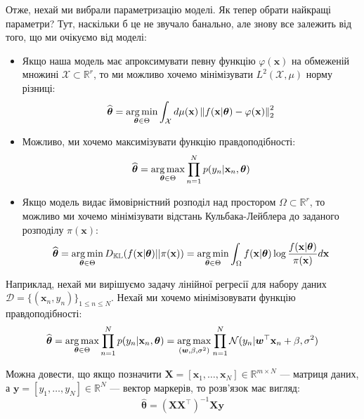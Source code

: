 Отже, нехай ми вибрали параметризацію моделі. Як тепер обрати найкращі параметри?
Тут, наскільки б це не звучало банально, але знову все залежить від того, що ми
очікуємо від моделі:
\begin{itemize}
	\item Якщо наша модель має апроксимувати певну функцію $\varphi(\mathbf{x})$ на 
	обмеженій множині $\mathcal{X} \subset \mathbb{R}^r$, то ми можливо хочемо 
	мінімізувати $L^2(\mathcal{X},\mu)$ норму різниці:
	\begin{equation*}
		\widehat{\boldsymbol{\theta}} = \operatorname*{arg\,min}_{\boldsymbol{\theta} \in \Theta} \int_{\mathcal{X}} d\mu(\mathbf{x}) \left\| f(\mathbf{x}|\boldsymbol{\theta}) - \varphi(\mathbf{x}) \right\|_2^2
	\end{equation*}
	\item Можливо, ми хочемо максимізувати функцію правдоподібності:
	\begin{equation*}
		\widehat{\boldsymbol{\theta}} = \operatorname*{arg\,max}_{\boldsymbol{\theta} \in \Theta} \prod_{n=1}^N p(y_n|\mathbf{x}_n,\boldsymbol{\theta})
	\end{equation*}
	\item Якщо модель видає ймовірністний розподіл над простором $\Omega \subset \mathbb{R}^r$, то можливо ми хочемо мінімізувати відстань Кульбака-Лейблера до заданого розподілу $\pi(\mathbf{x})$:
	\begin{equation*}
		\widehat{\boldsymbol{\theta}} = \operatorname*{arg\,min}_{\boldsymbol{\theta} \in \Theta} D_{\mathbb{KL}}(f(\mathbf{x}|\boldsymbol{\theta})||\pi(\mathbf{x})) = \operatorname*{arg\,min}_{\boldsymbol{\theta} \in \Theta} \int_{\Omega} f(\mathbf{x} | \boldsymbol{\theta}) \log \frac{f(\mathbf{x} | \boldsymbol{\theta})}{\pi(\mathbf{x})}d\mathbf{x}
	\end{equation*}
\end{itemize}

\begin{example}
	Наприклад, нехай ми вирішуємо задачу лінійної регресії для набору даних
	$\mathcal{D} = \{(\mathbf{x}_n, y_n)\}_{1 \leq n \leq N}$. Нехай ми хочемо 
	мінімізовувати функцію правдоподібності:
	\begin{equation}
		\widehat{\boldsymbol{\theta}} = \operatorname*{arg\,max}_{\boldsymbol{\theta} \in \Theta} \prod_{n=1}^N p(y_n|\mathbf{x}_n,\boldsymbol{\theta}) = \operatorname*{arg\,max}_{(\boldsymbol{w},\beta,\sigma^2)}\prod_{n=1}^N \mathcal{N}(y_n|\boldsymbol{w}^{\top}\mathbf{x}_n+\beta,\sigma^2)
	\end{equation}

	Можна довести, що якщо позначити $\mathbf{X} = [\mathbf{x}_1,\dots,\mathbf{x}_N] \in \mathbb{R}^{m \times N}$ --- матриця даних, а $\mathbf{y} = [y_1,\dots,y_N] \in \mathbb{R}^N$ --- вектор маркерів, то розв'язок має вигляд:
	\begin{equation}
		\widehat{\boldsymbol{\theta}} = (\mathbf{X}\mathbf{X}^{\top})^{-1}\mathbf{X}\mathbf{y}
	\end{equation}
\end{example}


